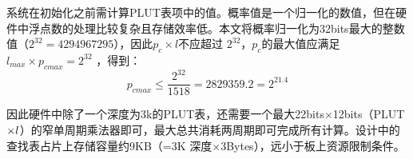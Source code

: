 系统在初始化之前需计算PLUT表项中的值。概率值是一个归一化的数值，但在硬件中浮点数的处理比较复杂且存储效率低。本文将概率归一化为32bits最大的整数值（$2^{32}=4294967295$），因此$ p_c \times l  $不应超过 $ 2^{32} $，$ p_c $的最大值应满足$ l_{max} \times p_{cmax} = 2^{32 } $ ，得到：
\begin{equation} \label{mydiscof6}
p_{cmax} \leq \dfrac{2^{32}}{1518} =2829359.2=2^{21.4}
\end{equation}



因此硬件中除了一个深度为3k的PLUT表，还需要一个最大22bits$\times$12bits（PLUT$\times \\
 l$）的窄单周期乘法器即可，最大总共消耗两周期即可完成所有计算。设计中的查找表占片上存储容量约9KB（=3K 深度$\times$3Bytes），远小于板上资源限制条件。

